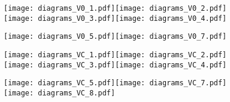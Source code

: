 \documentclass[11pt]{article}
\begin{document}
\begin{figure}[h]
\texttt{[image: diagrams\_V0\_1.pdf]}\texttt{[image: diagrams\_V0\_2.pdf]}\\
\texttt{[image: diagrams\_V0\_3.pdf]}\texttt{[image: diagrams\_V0\_4.pdf]}
\end{figure}


\begin{figure}[h]
\texttt{[image: diagrams\_V0\_5.pdf]}\texttt{[image: diagrams\_V0\_7.pdf]}
\end{figure}


\begin{figure}[h]
\texttt{[image: diagrams\_VC\_1.pdf]}\texttt{[image: diagrams\_VC\_2.pdf]}\\
\texttt{[image: diagrams\_VC\_3.pdf]}\texttt{[image: diagrams\_VC\_4.pdf]}
\end{figure}


\begin{figure}[h]
\texttt{[image: diagrams\_VC\_5.pdf]}\texttt{[image: diagrams\_VC\_7.pdf]}
\texttt{[image: diagrams\_VC\_8.pdf]}
\end{figure}



{}

\end{document}
